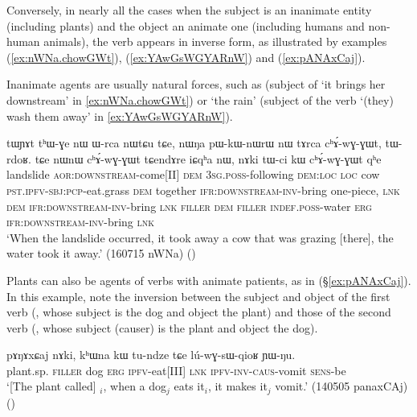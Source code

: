 Conversely, in nearly all the cases when the subject is an inanimate entity (including plants) and the object an animate one (including humans and non-human animals), the verb appears in inverse form, as illustrated by examples (\ref{ex:nWNa.chowGWt}), (\ref{ex:YAwGsWGYARnW}) and (\ref{ex:pANAxCaj}). 

Inanimate agents are usually natural forces, such as  (subject of  `it brings her downstream' in \ref{ex:nWNa.chowGWt}) or  `the rain'  (subject of the verb  `(they) wash them away' in \ref{ex:YAwGsWGYARnW}).   
 
\begin{exe}
\ex \label{ex:nWNa.chowGWt} 
\gll tɯɲɤt tʰɯ-ɣe nɯ ɯ-rca nɯtɕu tɕe, nɯŋa pɯ-kɯ-nɯrɯ nɯ tɤrca cʰɤ́-wɣ-ɣɯt, tɯ-rdoʁ. tɕe nɯnɯ cʰɤ́-wɣ-ɣɯt tɕendɤre iɕqʰa nɯ, nɤki tɯ-ci kɯ cʰɤ́-wɣ-ɣɯt qʰe \\
landslide \textsc{aor}:\textsc{downstream}-come[II] \textsc{dem} \textsc{3sg}.\textsc{poss}-following \textsc{dem}:\textsc{loc} \textsc{loc} cow  \textsc{pst}.\textsc{ipfv}-\textsc{sbj}:\textsc{pcp}-eat.grass \textsc{dem} together \textsc{ifr}:\textsc{downstream}-\textsc{inv}-bring one-piece, \textsc{lnk} \textsc{dem} \textsc{ifr}:\textsc{downstream}-\textsc{inv}-bring \textsc{lnk} \textsc{filler} \textsc{dem} \textsc{filler} \textsc{indef}.\textsc{poss}-water \textsc{erg} \textsc{ifr}:\textsc{downstream}-\textsc{inv}-bring  \textsc{lnk} \\
\glt `When the landslide occurred, it took away a cow that was grazing [there], the water took it away.' (160715 nWNa) 	
()
\end{exe}

Plants can also be agents of verbs with animate patients, as in (§\ref{ex:pANAxCaj}). In this example, note the inversion between the subject and object of the first verb (, whose subject is the dog and object the plant) and those of the second verb (, whose subject (causer) is the plant and object the dog).

\begin{exe}
\ex \label{ex:pANAxCaj} 
\gll pɤŋɤxɕaj nɤki, kʰɯna kɯ tu-ndze tɕe lú-wɣ-sɯ-qioʁ ɲɯ-ŋu. \\
plant.sp. \textsc{filler} dog \textsc{erg} \textsc{ipfv}-eat[III] \textsc{lnk} \textsc{ipfv}-\textsc{inv}-\textsc{caus}-vomit \textsc{sens}-be \\
\glt `[The plant called] $_i$, when a dog$_j$ eats it$_i$, it makes it$_j$ vomit.' (140505 panaxCAj)
()
\end{exe}

